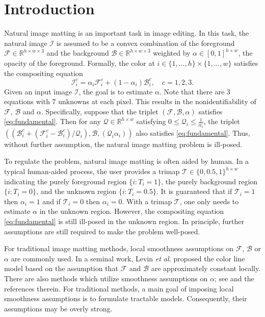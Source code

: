 \documentclass{article}
\theoremstyle{plain}
\begin{document}
\section{Introduction}

Natural image matting is an important task in image editing.
In this task,
the natural image $\mathcal I$ is assumed to be a convex combination of the
foreground $\mathcal F \in \mathbb R^{h \times w \times 3}$ and 
the background $\mathcal B \in \mathbb R^{h \times w \times 3}$
weighted by $\alpha \in [0, 1]^{h \times w}$, the opacity of the foreground.
Formally,
the color at $i \in \{1, \ldots, h\} \times \{1, \ldots, w\}$ satisfies the compositing equation
{\small
\begin{equation}
\label{eq:fundamental}
    \mathcal I_i^c= \alpha_i \mathcal F_i^c + (1-\alpha_i) \mathcal B_i^c,
    \quad c= 1,2, 3.
\end{equation}
}Given an input image $\mathcal I$,
the goal is to estimate $\alpha$.
Note that there are $3$ equations with $7$ unknowns at each pixel.
This results in the nonidentifiability of $\mathcal F$, $\mathcal B$ and $\alpha$.
Specifically, suppose that the triplet $(\mathcal F, \mathcal B, \alpha)$ satisfies \eqref{eq:fundamental}.
Then for any $\mathcal Q \in \mathbb R^{h \times w}$ satisfying $0 \leq \mathcal Q_i \leq \frac{1}{\alpha_i}$,
the triplet $((\mathcal B_i^c + (\mathcal F_i^c - \mathcal B_i^c) /\mathcal Q_i), \mathcal B, (\mathcal Q_i \alpha_i) )$ also satisfies \eqref{eq:fundamental}.
Thus, without further assumption, the natural image matting problem is ill-posed.


To regulate the problem,
natural image matting is often aided by human.
In a typical human-aided process,
the user provides a trimap $\mathcal T \in \{0, 0.5, 1\}^{h \times w}$ indicating
the purely foreground region $\{i: T_i = 1\}$, 
the purely background region $\{i: T_i = 0\}$,
and the unknown region $\{i: T_i = 0.5\}$.
It is guaranteed that if $\mathcal T_i = 1$ then $\alpha_i = 1$ and if $\mathcal T_i = 0$ then $\alpha_i = 0$.
With a trimap $\mathcal T$, one only needs to estimate $\alpha$ in the unknown region.
However, the compositing equation \eqref{eq:fundamental} is still ill-posed in the unknown region.
In principle, 
further assumptions are still required to make the problem well-posed.





For traditional image matting methods,
local smoothness assumptions on $\mathcal F$, $\mathcal B$ or $\alpha$ are commonly used.
In a seminal work,
Levin \emph{et al.} \cite{Levin2008AClosed-Form} proposed the color line model based on the assumption that $\mathcal F$ and $\mathcal B$ are approximately constant locally.
There are also methods which utilize smoothness assumptions on $\alpha$; 
see \cite{Price2010Simultaneous} and the references therein.
For traditional methods,
a main goal of
imposing local smoothness assumptions
is to formulate tractable models.
Consequently, their assumptions may be overly strong.
\end{document}
